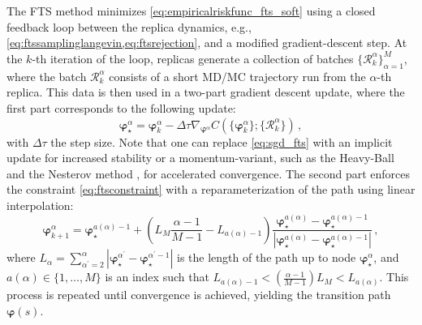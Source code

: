 \documentclass{article}
\numberwithin{equation}{section}
\theoremstyle{definition}
\theoremstyle{remark}
\def\varphib{\boldsymbol{\varphi}}
\begin{document}
The FTS method minimizes \cref{eq:empiricalriskfunc_fts_soft} using a closed feedback loop between the replica dynamics, e.g., \cref{eq:ftssamplinglangevin,eq:ftsrejection}, and a modified gradient-descent step. 
At the $k$-th iteration of the loop, replicas generate a collection of batches $\{ \mathcal{R}^\alpha_k \}_{\alpha=1}^M$, where the batch $\mathcal{R}^\alpha_k$ consists of a short MD/MC trajectory run from the $\alpha$-th replica.
This data is then used in a two-part gradient descent update, where the first part corresponds to the following update:
\begin{equation}
\varphib_{\star}^\alpha = \varphib^\alpha_k-\Delta \tau \nabla_{\varphib^\alpha} \hat{C}(\{\varphib^\alpha_k\}; \{\mathcal{R}^\alpha_k\}) \,,
\label{eq:sgd_fts}
\end{equation}
with $\Delta \tau$ the step size. 
Note that one can replace \cref{eq:sgd_fts} with an implicit update for increased stability or a momentum-variant, such as the Heavy-Ball \cite{polyak1964some} and the Nesterov method \cite{nesterov1983method}, for accelerated convergence.
The second part enforces the constraint \cref{eq:ftsconstraint} with a reparameterization of the path using linear interpolation:
\begin{equation}
\varphib^{\alpha}_{k+1} = 
    \varphib^{a(\alpha)-1}_{\star}+\left(L_M\frac{\alpha-1}{M-1}-L_{a(\alpha)-1}\right) \frac{\varphib^{a(\alpha)}_{\star}-\varphib^{a(\alpha)-1}_{\star}}{\left|\varphib^{a(\alpha)}_{\star}-\varphib^{a(\alpha)-1}_{\star}\right|} \,, 
    \label{eq:projection_fts}
\end{equation}
where $L_\alpha = \sum_{\alpha^\prime=2}^\alpha |\varphib^{\alpha^\prime}_\star-\varphib^{\alpha^\prime-1}_\star|$ is the length of the path up to node $\varphib^\alpha_{\star}$, and $a(\alpha) \in \{1,\ldots,M\}$ is an index such that $L_{a(\alpha)-1} < \left(\frac{\alpha-1}{M-1}\right) L_M < L_{a(\alpha)}$. 
This process is repeated until convergence is achieved, yielding the transition path $\varphib(s)$.
\end{document}
